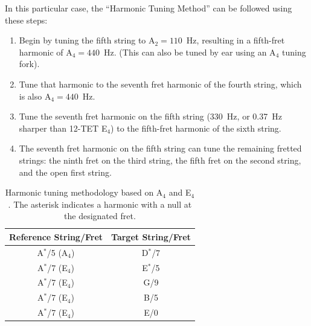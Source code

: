 In this particular case, the ``Harmonic Tuning Method'' can be followed using these steps:
 \begin{enumerate}
  \item Begin by tuning the fifth string to A$_2 = 110$~Hz, resulting in a fifth-fret harmonic of A$_4 = 440$~Hz. (This can also be tuned by ear using an A$_4$ tuning fork).
  \item Tune that harmonic to the seventh fret harmonic of the fourth string, which is also A$_4 = 440$~Hz.
  \item Tune the seventh fret harmonic on the fifth string (330~Hz, or 0.37~Hz sharper than 12-TET E$_4$) to the fifth-fret harmonic of the sixth string.
  \item The seventh fret harmonic on the fifth string can tune the remaining fretted strings: the ninth fret on the third string, the fifth fret on the second string, and the open first string.
 \end{enumerate}
 \begin{table}[htbp]
  \centering
  \caption{\label{tbl:harmonic_tuning} Harmonic tuning methodology based on A$_4$ and E$_4$. The asterisk indicates a harmonic with a null at the designated fret.}
    \begin{tabular}{cc}
    \toprule
    Reference String/Fret &  Target String/Fret \\
    \midrule
     A$^\ast$/5 (A$_4$) & D$^\ast$/7 \\
     A$^\ast$/7 (E$_4$) & E$^\ast$/5 \\
     A$^\ast$/7 (E$_4$) & G/9 \\
     A$^\ast$/7 (E$_4$) & B/5 \\
     A$^\ast$/7 (E$_4$) & E/0 \\
    \bottomrule
    \end{tabular}
 \end{table}%

